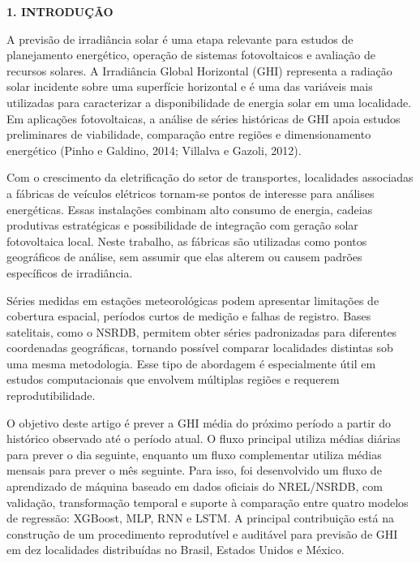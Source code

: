 \documentclass[12pt,a4paper]{article}
\begin{document}
\vspace{24pt}

\noindent\textbf{1. INTRODUÇÃO}

A previsão de irradiância solar é uma etapa relevante para estudos de planejamento energético, operação de sistemas fotovoltaicos e avaliação de recursos solares. A Irradiância Global Horizontal (GHI) representa a radiação solar incidente sobre uma superfície horizontal e é uma das variáveis mais utilizadas para caracterizar a disponibilidade de energia solar em uma localidade. Em aplicações fotovoltaicas, a análise de séries históricas de GHI apoia estudos preliminares de viabilidade, comparação entre regiões e dimensionamento energético (Pinho e Galdino, 2014; Villalva e Gazoli, 2012).

Com o crescimento da eletrificação do setor de transportes, localidades associadas a fábricas de veículos elétricos tornam-se pontos de interesse para análises energéticas. Essas instalações combinam alto consumo de energia, cadeias produtivas estratégicas e possibilidade de integração com geração solar fotovoltaica local. Neste trabalho, as fábricas são utilizadas como pontos geográficos de análise, sem assumir que elas alterem ou causem padrões específicos de irradiância.

Séries medidas em estações meteorológicas podem apresentar limitações de cobertura espacial, períodos curtos de medição e falhas de registro. Bases satelitais, como o NSRDB, permitem obter séries padronizadas para diferentes coordenadas geográficas, tornando possível comparar localidades distintas sob uma mesma metodologia. Esse tipo de abordagem é especialmente útil em estudos computacionais que envolvem múltiplas regiões e requerem reprodutibilidade.

O objetivo deste artigo é prever a GHI média do próximo período a partir do histórico observado até o período atual. O fluxo principal utiliza médias diárias para prever o dia seguinte, enquanto um fluxo complementar utiliza médias mensais para prever o mês seguinte. Para isso, foi desenvolvido um fluxo de aprendizado de máquina baseado em dados oficiais do NREL/NSRDB, com validação, transformação temporal e suporte à comparação entre quatro modelos de regressão: XGBoost, MLP, RNN e LSTM. A principal contribuição está na construção de um procedimento reprodutível e auditável para previsão de GHI em dez localidades distribuídas no Brasil, Estados Unidos e México.

\vspace{12pt}
\end{document}
